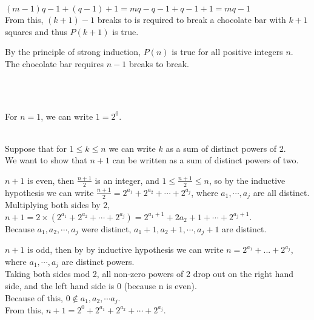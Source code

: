 \documentclass[12pt]{article}  %
\begin{document}
\noindent
$(m-1)q-1+(q-1)+1=mq-q-1+q-1+1=mq-1$\\
From this, $(k+1)-1$ breaks to is required to break a chocolate bar with $k+1$ squares and thus $P(k+1)$ is true.

\noindent
By the principle of strong induction, $P(n)$ is true for all positive integers $n$.
The chocolate bar requires $n-1$ breaks to break.

\clearpage
{}\\

\\
For $n=1$, we can write $1=2^0$.

\\
Suppose that for $1\leq k\leq n$ we can write $k$ as a sum of distinct powers of 2.\\
We want to show that $n+1$ can be written as a sum of distinct powers of two.

 $n+1$ is even, then $\displaystyle\frac{n+1}{2}$ is an integer, and $\displaystyle1\leq \frac{n+1}{2}\leq n$, so by the inductive hypothesis we can write $\displaystyle\frac{n+1}{2}=2^{a_1}+2^{a_2}+\cdots+2^{a_j}$, where $a_1,\cdots,a_j$ are all distinct.\\
Multiplying both sides by 2, $n+1=2\times(2^{a_1}+2^{a_2}+\cdots+2^{a_j})=2^{a_1+1}+2{a_2+1}+\cdots+2^{a_j+1}$.\\
Because $a_1,a_2,\cdots,a_j$ were distinct, $a_1+1,a_2+1,\cdots,a_j+1$ are distinct.

 $n+1$ is odd, then by by inductive hypothesis we can write $n=2^{a_1}+...+2^{a_j}$, where $a_1,\cdots,a_j$ are distinct powers.\\
Taking both sides mod 2, all non-zero powers of 2 drop out on the right hand side, and the left hand side is 0 (because n is even).\\
Because of this, $0\not\in{a_1,a_2,\cdots a_j}$.\\
From this, $n+1=2^0+2^{a_1}+2^{a_2}+\cdots+2^{a_j}$.

\\
\end{document}
